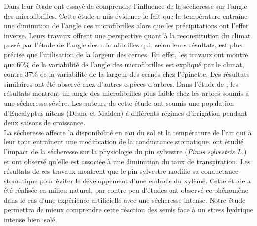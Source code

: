 \documentclass{report}
\begin{document}
\begin{itemize}
	Dans leur étude \cite{Xu2012} ont essayé de comprendre l'influence de la sécheresse sur l'angle des microfibrilles. Cette étude a mis évidence le fait que la température %
	entraîne une diminution de l'angle des microfibrilles alors que les précipitations ont l'effet inverse. Leurs travaux offrent une perspective quant à la reconstitution du climat passé par l'étude de l'angle des microfibrilles qui, selon leurs résultats, est plus précise que l'utilisation de la largeur des cernes. En effet, les travaux ont montré que 60\% de la variabilité de l'angle des microfibrilles est expliqué par le climat, contre 37\% de la variabilité de la largeur des cernes chez l'épinette. Des résultats similaires ont été observé chez d'autres espèces d'arbres. Dans l'étude de \cite{Wimmer2002}, les résultats montrent un angle des microfibrilles plus faible chez les arbres soumis à une sécheresse sévère. Les auteurs de cette étude ont soumis une population d'Eucalyptus nitens (Deane et Maiden) à différents régimes d'irrigation pendant deux saisons de croissance.\\ %
	La sécheresse affecte la disponibilité en eau du sol et la température de l'air  %
	qui à leur tour entraînent une modification de la conductance stomatique. \cite{Irvine1997} ont étudié l'impact de la sécheresse sur la physiologie du pin sylvestre (\textit{Pinus sylvestris L.})%
	et ont observé qu'elle est associée à une diminution du taux de transpiration. Les résultats de ces travaux montrent que le pin sylvestre modifie sa conductance stomatique pour éviter le développement d'une embolie du xylème. Cette étude a été réalisée en milieu naturel, par contre peu d'études ont observé ce phénomène dans le cas d'une expérience artificielle avec une sécheresse intense. Notre étude permettra de mieux comprendre cette réaction des semis face à un stress hydrique intense bien isolé.\\
	

\end{itemize}
\end{document}
